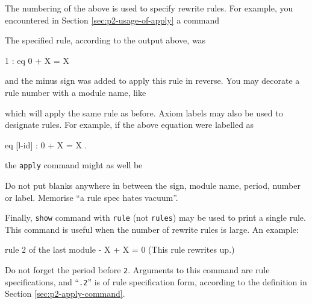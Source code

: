 \documentclass[a4paper]{memoir}
\begin{document}
The numbering of the above is used to specify rewrite rules.
For example, you encountered in Section \ref{sec:p2-usage-of-apply} a
command
\begin{vvtm}
\begin{ccode}
\end{ccode}
\end{vvtm}
The specified rule, according to the output above, was
\begin{vvtm}
\begin{ccode}
    1 : eq 0 + X = X
\end{ccode}
\end{vvtm}
and the minus sign was added to apply this rule in reverse.
You may decorate a rule number with a module name, like
\begin{vvtm}
\begin{ccode}
\end{ccode}
\end{vvtm}
which will apply the same rule as before.
Axiom labels may also be used to designate rules. For example, if
the above equation were labelled as
\begin{vvtm}
\begin{ccode}
  eq [l-id] : 0 + X = X .
\end{ccode}
\end{vvtm}
the \verb|apply| command might as well be
\begin{vvtm}
\begin{ccode}
\end{ccode}
\end{vvtm}

\begin{warning}
  Do not put blanks anywhere in between the sign, module name, period,
  number or label. Memorise ``a rule spec hates vacuum''.
\end{warning}

Finally, \verb|show| command with \verb|rule| (not \verb|rules|) may be
used to print a single rule. This command is useful when the number of
rewrite rules is large. An example:
\begin{vvtm}
\begin{ccode}
  rule 2 of the last module
    - X + X = 0
  (This rule rewrites up.)
\end{ccode}
\end{vvtm}
Do not forget the period before \verb|2|. Arguments to this command are
rule specifications, and ``\verb|.2|'' is of rule specification form,
according to the definition in Section \ref{sec:p2-apply-command}.
\end{document}

